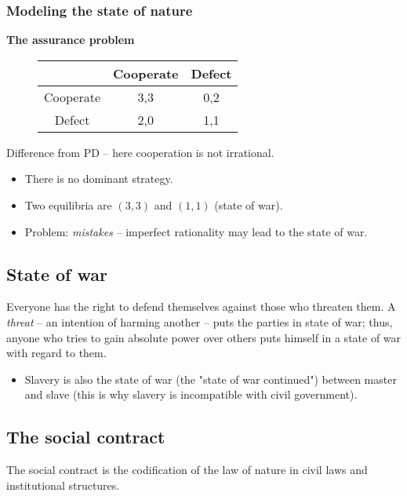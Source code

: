 \subsubsection{Modeling the state of nature}

\textbf{The assurance problem}

\begin{figure}[H]
    \centering
    \begin{tabular}{|c|c|c|}
        \hline
        & Cooperate & Defect \\
        \hline
        Cooperate & 3,3 & 0,2 \\
        \hline
        Defect & 2,0 & 1,1 \\
        \hline
    \end{tabular}
\end{figure}

Difference from PD -- here cooperation is not irrational.

\begin{itemize}
    \item There is no dominant strategy.
    \item Two equilibria are $(3, 3)$ and $(1, 1)$ (state of war).
    \item Problem: \textit{mistakes} -- imperfect rationality may lead to the
    state of war.
\end{itemize}

\subsection{State of war}

Everyone has the right to defend themselves against those who threaten them.
A \textit{threat} -- an intention of harming another -- puts the parties in
state of war; thus, anyone who tries to gain absolute power over others puts
himself in a state of war with regard to them.

\begin{itemize}
    \item Slavery is also the state of war (the "state of war continued")
    between master and slave (this is why slavery is incompatible with civil
    government).
\end{itemize}

\subsection{The social contract}

The social contract is the codification of the law of nature in civil laws and
institutional structures.

